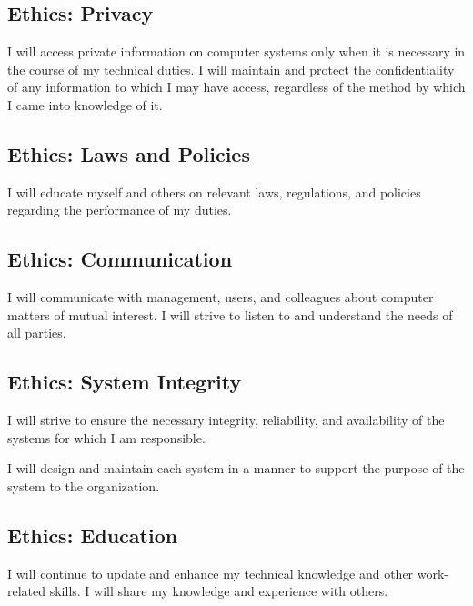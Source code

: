 \documentclass[xga]{xdvislides}
\begin{document}
\subsection{Ethics: Privacy}
\vfill
\begin{center}
I will access private information on computer systems only when it is
necessary in the course of my technical duties. I will maintain and
protect the confidentiality of any information to which I may have access,
regardless of the method by which I came into knowledge of it.
\end{center}
\vfill

\subsection{Ethics: Laws and Policies}
\vfill
\begin{center}
I will educate myself and others on relevant laws, regulations, and
policies regarding the performance of my duties.
\end{center}
\vfill

\subsection{Ethics: Communication}
\vfill
\begin{center}
I will communicate with management, users, and colleagues about computer
matters of mutual interest. I will strive to listen to and understand the
needs of all parties.
\end{center}
\vfill

\subsection{Ethics: System Integrity}
\vfill
\begin{center}
I will strive to ensure the necessary integrity, reliability, and
availability of the systems for which I am responsible. \\
\vspace{.5in}

I will design and maintain each system in a manner to support the
purpose of the system to the organization.
\end{center}
\vfill

\subsection{Ethics: Education}
\vfill
\begin{center}
I will continue to update and enhance my technical knowledge and other
work-related skills. I will share my knowledge and experience with others.
\end{center}
\vfill
\end{document}
